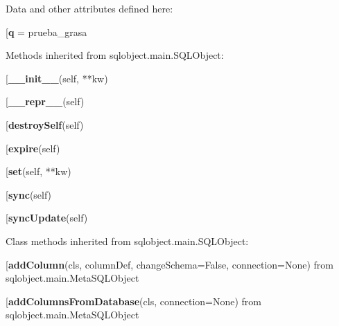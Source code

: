 Data and other attributes defined here:\\
\begin{description}\item[{\bf q} = prueba\_grasa\end{description}


Methods inherited from sqlobject.main.SQLObject:\\
\begin{description}\item[{\bf \_\_init\_\_}(self, **kw)\end{description}

\begin{description}\item[{\bf \_\_repr\_\_}(self)\end{description}

\begin{description}\item[{\bf destroySelf}(self)\end{description}

\begin{description}\item[{\bf expire}(self)\end{description}

\begin{description}\item[{\bf set}(self, **kw)\end{description}

\begin{description}\item[{\bf sync}(self)\end{description}

\begin{description}\item[{\bf syncUpdate}(self)\end{description}


Class methods inherited from sqlobject.main.SQLObject:\\
\begin{description}\item[{\bf addColumn}(cls, columnDef, changeSchema=False, connection=None) from sqlobject.main.MetaSQLObject\end{description}

\begin{description}\item[{\bf addColumnsFromDatabase}(cls, connection=None) from sqlobject.main.MetaSQLObject\end{description}

